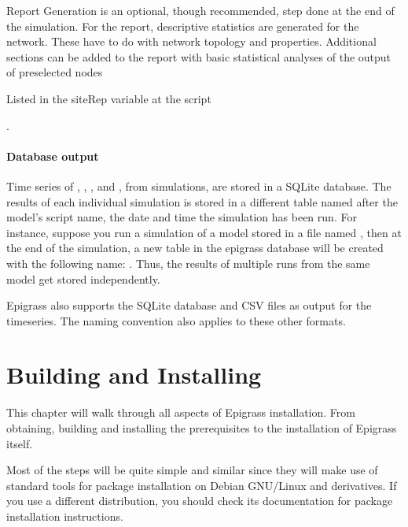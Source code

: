 \documentclass[letterpaper,10pt,english]{sphinxmanual}
\begin{document}
Report Generation is an optional, though recommended, step done at the end of the simulation. For the report,
descriptive statistics are generated for the network. These have to do with network topology and properties.
Additional sections can be added to the report with basic statistical analyses of the output of pre\sphinxhyphen{}selected nodes %
\begin{footnote}[2]\sphinxAtStartFootnote
Listed in the siteRep variable at the script
%
\end{footnote} .


\subsubsection{Database output}
\label{\detokenize{overview:database-output}}
\ignorespaces 
Time series of , , , and , from simulations, are stored in a SQLite database.
The results of each individual simulation is stored in a different table named after the model’s script name, the date
and time the simulation has been run. For instance, suppose you run a simulation of a model stored in a file named
, then at the end of the simulation, a new table in the epigrass database will be created with the
following name: . Thus, the results of multiple runs from the same model get
stored independently.

Epigrass also supports the SQLite database and CSV files as output for the time\sphinxhyphen{}series. The naming convention also
applies to these other formats.


\chapter{Building and Installing}
\label{\detokenize{install:building-and-installing}}\label{\detokenize{install:install}}\label{\detokenize{install::doc}}
This chapter will walk through all aspects of Epigrass installation. From obtaining, building and installing  the prerequisites to the installation of Epigrass itself.

Most of the steps will be quite simple and similar since they will make use of standard tools for package installation on Debian GNU/Linux and derivatives. If you use a different distribution, you should check its documentation for package installation instructions.
\end{document}
